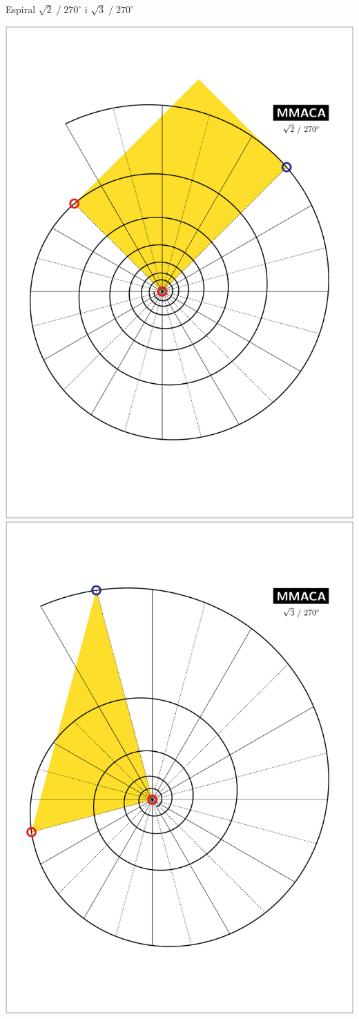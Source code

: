\documentclass[14pt]{beamer}
\begin{document}

    \begin{frame}{Espiral\; $\sqrt{2}\;/\;270^\circ$\; i\; $\sqrt{3}\;/\;270^\circ$}
        \begin{center}
            \includegraphics[height=34ex]{pictures/Example_6.pdf}\quad
            \includegraphics[height=34ex]{pictures/Example_7.pdf}
        \end{center}
    \end{frame}

    
\end{document}
